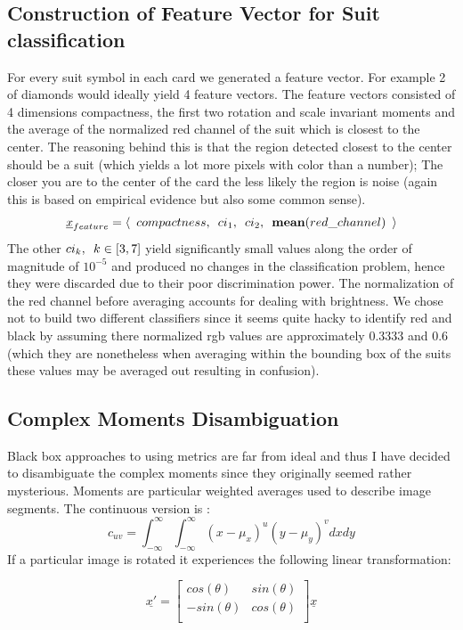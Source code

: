 \documentclass[11pt]{article}
\theoremstyle{plain}
\theoremstyle{definition}
\begin{document}
\subsection{Construction of Feature Vector for Suit classification}
For every suit symbol in each card we generated a feature vector. For example 2 of diamonds would ideally yield 4 feature vectors. The feature vectors consisted of 4 dimensions compactness, the first two rotation and scale invariant moments and the average of 
the normalized red channel of the suit which is closest to the center. The reasoning behind this is that the region detected closest to the center should be a suit (which yields a lot more pixels with color than a number); The closer you are to the center of the card the less likely the region is noise (again this is based on empirical evidence but also some common sense).
\[
\underline{x}_{feature} = \braket{\enskip compactness, \enskip ci_{1}, \enskip ci_{2}, \enskip \text{\bf mean}(red\_channel) \enskip}
\]
The other $ci_{k}, \enskip k \in [3,7]$ yield significantly small values along the order of magnitude of $10^{-5}$ and produced no changes in the classification problem, hence they were discarded due to their poor discrimination power. The normalization of the red channel before averaging accounts for dealing with brightness. We chose not to build two different classifiers since it seems quite hacky to identify red and black by assuming there normalized rgb values are approximately 0.3333 and 0.6 (which they are nonetheless when averaging within the bounding box of the suits these values may be averaged out resulting in confusion). 

\subsection{Complex Moments Disambiguation}
Black box approaches to using metrics are far from ideal and thus I have decided to disambiguate the complex moments since they originally seemed rather mysterious.
Moments are particular weighted averages used to describe image segments. The continuous version is :
\[c_{uv} =
\int^{\infty}_{-\infty}\int^{\infty}_{-\infty}(x -\mu_{x})^{u}(y - \mu_{y})^{v}dxdy
\]
If a particular image is rotated it experiences
the following linear transformation:

\[
\underline{x'}=
\begin{bmatrix}
  cos(\theta) & sin(\theta) \\
  -sin(\theta) & cos(\theta)  \\
 \end{bmatrix} \underline{x}
\]
\end{document}
